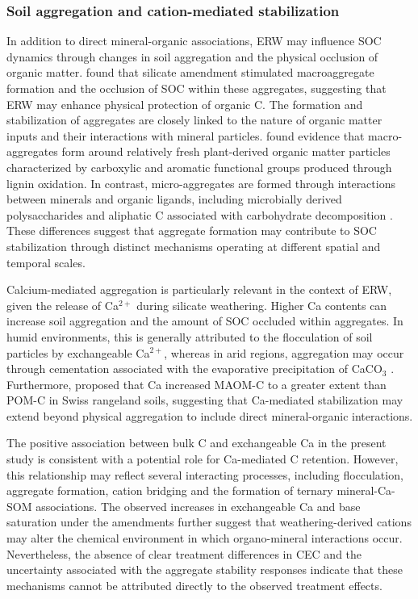 \documentclass[preprint,12pt]{elsarticle}
\begin{document}
\subsubsection{Soil aggregation and cation-mediated stabilization}

In addition to direct mineral-organic associations, ERW may influence SOC dynamics through changes in soil aggregation and the physical occlusion of organic matter. \citep{steinwidder2025beyond} found that silicate amendment stimulated macroaggregate formation and the occlusion of SOC within these aggregates, suggesting that ERW may enhance physical protection of organic C. The formation and stabilization of aggregates are closely linked to the nature of organic matter inputs and their interactions with mineral particles. \citep{verchot2011organic} found evidence that macro-aggregates form around relatively fresh plant-derived organic matter particles characterized by carboxylic and aromatic functional groups produced through lignin oxidation. In contrast, micro-aggregates are formed through interactions between minerals and organic ligands, including microbially derived polysaccharides and aliphatic C associated with carbohydrate decomposition \citep{verchot2011organic}. These differences suggest that aggregate formation may contribute to SOC stabilization through distinct mechanisms operating at different spatial and temporal scales.

Calcium-mediated aggregation is particularly relevant in the context of ERW, given the release of Ca$^{2+}$ during silicate weathering. Higher Ca contents can increase soil aggregation and the amount of SOC occluded within aggregates. In humid environments, this is generally attributed to the flocculation of soil particles by exchangeable Ca$^{2+}$, whereas in arid regions, aggregation may occur through cementation associated with the evaporative precipitation of CaCO$_3$ \citep{muneer1989calcium,fernandezugalde2014mechanisms}. Furthermore, \citep{rowley2021calcium} proposed that Ca increased MAOM-C to a greater extent than POM-C in Swiss rangeland soils, suggesting that Ca-mediated stabilization may extend beyond physical aggregation to include direct mineral-organic interactions.

The positive association between bulk C and exchangeable Ca in the present study is consistent with a potential role for Ca-mediated C retention. However, this relationship may reflect several interacting processes, including flocculation, aggregate formation, cation bridging and the formation of ternary mineral-Ca-SOM associations. The observed increases in exchangeable Ca and base saturation under the amendments further suggest that weathering-derived cations may alter the chemical environment in which organo-mineral interactions occur. Nevertheless, the absence of clear treatment differences in CEC and the uncertainty associated with the aggregate stability responses indicate that these mechanisms cannot be attributed directly to the observed treatment effects.
\end{document}
